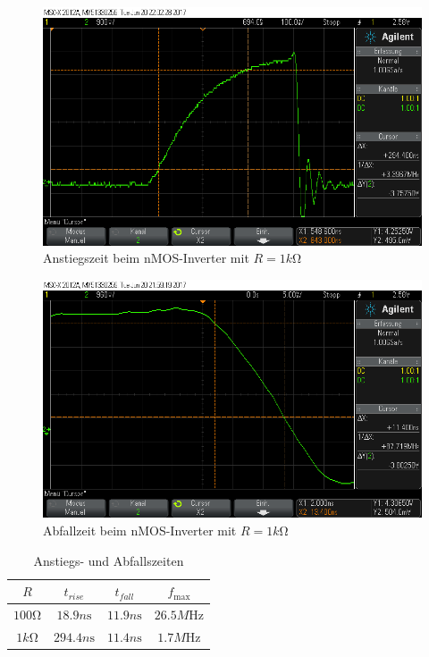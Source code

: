 \documentclass[10pt]{scrreprt}
\begin{document}
    \begin{figure}[H]
        \includegraphics[width=\textwidth]{scope_6.png}
        \caption{Anstiegszeit beim nMOS-Inverter mit $R = 1\si{k\ohm}$}
    \end{figure}
    \begin{figure}[H]
        \includegraphics[width=\textwidth]{scope_5.png}
        \caption{Abfallzeit beim nMOS-Inverter mit $R = 1\si{k\ohm}$}
    \end{figure}

    \begin{table}[H]
        \centering
        \begin{tabular}{cccc}
            \toprule
            $R$ & $t_{rise}$ & $t_{fall}$ & $f_{\max}$\\
            \midrule
            $100\si{\ohm}$ & $18.9\si{n\second}$ & $11.9\si{n\second}$ & $26.5\si{M\hertz}$\\
            $1\si{k\ohm}$ & $294.4\si{n\second}$ & $11.4\si{n\second}$ & $1.7\si{M\hertz}$\\
            \bottomrule
        \end{tabular}
        \caption{Anstiegs- und Abfallszeiten}
    \end{table}
\end{document}
